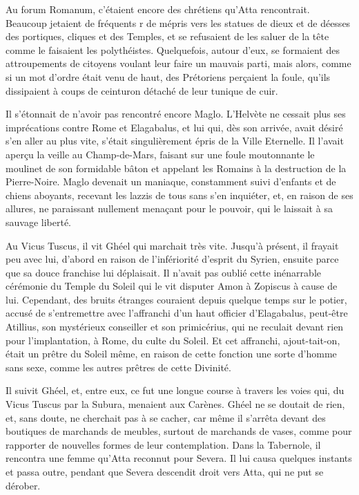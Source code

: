 \documentclass[a4paper, 11pt, oneside, polutonikogreek, french]{article}
\begin{document}
Au forum Romanum, c'étaient encore des chrétiens qu'Atta rencontrait. Beaucoup jetaient de fréquents r de mépris vers les statues de dieux et de déesses des portiques, cliques et des Temples, et se refusaient de les saluer de la tête comme le faisaient les polythéistes. Quelquefois, autour d'eux, se formaient des attroupements de citoyens voulant leur faire un mauvais parti, mais alors, comme si un mot d'ordre était venu de haut, des Prétoriens perçaient la foule, qu'ils dissipaient à coups de ceinturon détaché de leur tunique de cuir.

Il s'étonnait de n'avoir pas rencontré encore Maglo. L'Helvète ne cessait plus ses imprécations contre Rome et Elagabalus, et lui qui, dès son arrivée, avait désiré s'en aller au plus vite, s'était singulièrement épris de la Ville Eternelle. Il l'avait aperçu la veille au Champ-de-Mars, faisant sur une foule moutonnante le moulinet de son formidable bâton et appelant les Romains à la destruction de la Pierre-Noire. Maglo devenait un maniaque, constamment suivi d'enfants et de chiens aboyants, recevant les lazzis de tous sans s'en inquiéter, et, en raison de ses allures, ne paraissant nullement menaçant pour le pouvoir, qui le laissait à sa sauvage liberté.

Au Vicus Tuscus, il vit Ghéel qui marchait très vite. Jusqu'à présent, il frayait peu avec lui, d'abord en raison de l'infériorité d'esprit du Syrien, ensuite parce que sa douce franchise lui déplaisait. Il n'avait pas oublié cette inénarrable cérémonie du Temple du Soleil qui le vit disputer Amon à Zopiscus à cause de lui. Cependant, des bruits étranges couraient depuis quelque temps sur le potier, accusé de s'entremettre avec l'affranchi d'un haut officier d'Elagabalus, peut-être Atillius, son mystérieux conseiller et son primicérius, qui ne reculait devant rien pour l'implantation, à Rome, du culte du Soleil. Et cet affranchi, ajout-tait-on, était un prêtre du Soleil même, en raison de cette fonction une sorte d'homme sans sexe, comme les autres prêtres de cette Divinité.

Il suivit Ghéel, et, entre eux, ce fut une longue course à travers les voies qui, du Vicus Tuscus par la Subura, menaient aux Carènes. Ghéel ne se doutait de rien, et, sans doute, ne cherchait pas à se cacher, car même il s'arrêta devant des boutiques de marchands de meubles, surtout de marchands de vases, comme pour rapporter de nouvelles formes de leur contemplation. Dans la Tabernole, il rencontra une femme qu'Atta reconnut pour Severa. Il lui causa quelques instants et passa outre, pendant que Severa descendit droit vers Atta, qui ne put se dérober.
\end{document}
